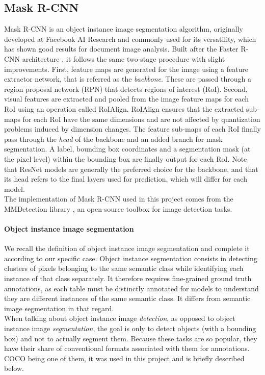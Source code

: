 \subsection{Mask R-CNN}
Mask R-CNN \citep{he_mask_2018} is an object instance image segmentation algorithm, originally developed at Facebook AI Research and commonly used for its versatility, which has shown good results for document image analysis. Built after the Faster R-CNN architecture \citep{ren_faster_2016}, it follows the same two-stage procedure with slight improvements. First, feature maps are generated for the image using a feature extractor network, that is referred as the \textit{backbone}. These are passed through a region proposal network (RPN) that detects regions of interest (RoI). Second, visual features are extracted and pooled from the image feature maps for each RoI using an operation called RoIAlign. RoIAlign ensures that the extracted sub-maps for each RoI have the same dimensions and are not affected by quantization problems induced by dimension changes. The feature sub-maps of each RoI finally pass through the \textit{head} of the backbone and an added branch for mask segmentation. A label, bounding box coordinates and a segmentation mask (at the pixel level) within the bounding box are finally output for each RoI. Note that ResNet models \citep{he_deep_2015} are generally the preferred choice for the backbone, and that its head refers to the final layers used for prediction, which will differ for each model.\\
The implementation of Mask R-CNN used in this project comes from the MMDetection library \citep{chen_mmdetection_2019}, an open-source toolbox for image detection tasks.

\paragraph{Object instance image segmentation}
We recall the definition of object instance image segmentation and complete it according to our specific case. Object instance segmentation consists in detecting clusters of pixels belonging to the same semantic class while identifying each instance of that class separately. It therefore requires fine-grained ground truth annotations, as each table must be distinctly annotated for models to understand they are different instances of the same semantic class. It differs from semantic image segmentation in that regard.\\
When talking about object instance image \textit{detection}, as opposed to object instance image \textit{segmentation}, the goal is only to detect objects (with a bounding box) and not to actually segment them. Because these tasks are so popular, they have their share of conventional formats associated with them for annotations. COCO \citep{lin_microsoft_2014} being one of them, it was used in this project and is briefly described below.

